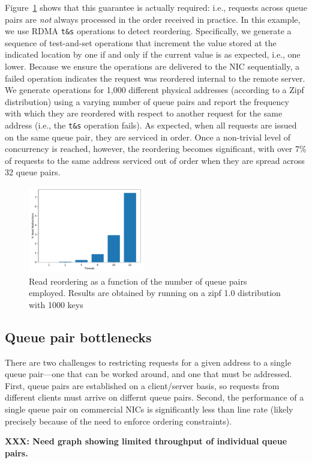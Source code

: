 Figure~\ref{fig:reorder} shows that this guarantee is actually
required: i.e., requests across queue pairs are \emph{not} always
processed in the order received in practice.  In this example, we use
RDMA \texttt{t\&s} operations to detect reordering.  Specifically, we
generate a sequence of test-and-set operations that increment the
value stored at the indicated location by one if and only if the
current value is as expected, i.e., one lower.  Because we ensure the
operations are delivered to the NIC sequentially, a failed operation
indicates the request was reordered internal to the remote server.  We
generate operations for 1,000 different physical addresses (according
to a Zipf distribution) using a varying number of queue pairs and report
the frequency with which they are reordered with respect to another
request for the same address (i.e., the \texttt{t\&s} operation
fails).  As expected, when all requests
are issued on the same queue pair, they are serviced in order.  Once a
non-trivial level of concurrency is reached, however, the reordering
becomes significant, with over 7\% of requests to the same address
serviced out of order when they are spread across 32 queue pairs.

\begin{figure}[t]
    \includegraphics[width=0.45\textwidth]{fig/read_reordering.pdf}
    \caption{Read reordering as a function of the number of queue pairs employed. Results are obtained by running on a zipf 1.0 distribution with 1000 keys}
    \label{fig:reorder}
\end{figure}

\subsection{Queue pair bottlenecks}

 There are two challenges to restricting requests for a given address
 to a single queue pair---one that can be worked around, and one that
 must be addressed.  First, queue pairs are established on a
 client/server basis, so requests from different clients must arrive
 on differnt queue pairs.  Second, the performance of a single queue
 pair on commercial NICs is significantly less than line rate (likely
 precisely because of the need to enforce ordering constraints).

 \textbf{XXX: Need graph showing limited throughput of individual queue pairs.}
 





